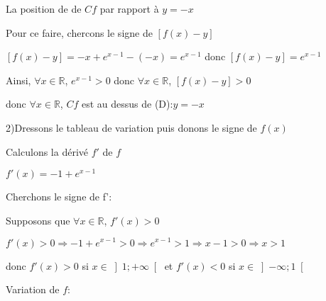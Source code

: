 \documentclass[12pt]{article}
\begin{document}
La position de de $Cf$ par rapport à $y=-x$

Pour ce faire, chercons le signe de $\left[ f(x)-y\right] $

$\left[ f(x)-y\right]=-x+e^{x-1}-(-x)=e^{x-1}$ donc $\left[ f(x)-y\right]=e^{x-1}$

Ainsi, $\forall x \in \mathbb{R}$, $e^{x-1}>0$ donc $\forall x \in \mathbb{R}$, $\left[ f(x)-y\right]>0$

donc $\forall x \in \mathbb{R}$, $Cf$ est au dessus de (D):$y=-x$

2)Dressons le tableau de variation puis donons le signe de $f(x)$

Calculons la dérivé $f'$ de $f$

$f'(x)=-1+e^{x-1}$

Cherchons le signe de f':

Supposons que $\forall x \in \mathbb{R}$, $f'(x)>0$

$f'(x)>0 \Longrightarrow -1+e^{x-1}>0 \Longrightarrow e^{x-1}>1 \Longrightarrow x-1>0 \Longrightarrow x>1$ 

donc $f'(x)>0$ si $x\in\left]1; +\infty\right[ $ et $f'(x)<0$ si $x\in\left]-\infty; 1\right[ $

Variation de $f$:
\end{document}
